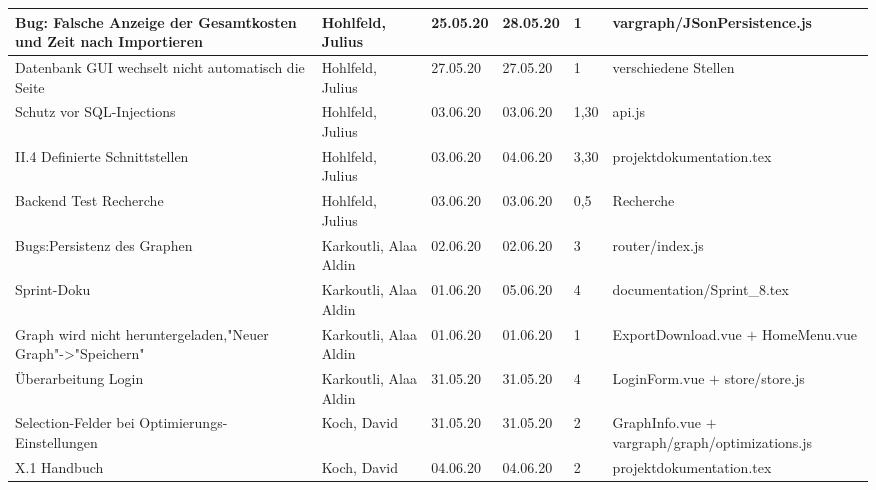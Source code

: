 \begin{longtable}{|p{4cm}|p{2cm}|p{1.2cm}|p{1.2cm}|p{0.7cm}|p{3.8cm}|}
  Bug: Falsche Anzeige der Gesamtkosten und Zeit nach Importieren       & Hohlfeld, Julius      & 25.05.20 & 28.05.20 & 1     & vargraph/JSonPersistence.js                                                    \\ \hline         
  Datenbank GUI wechselt nicht automatisch die Seite                    & Hohlfeld, Julius      & 27.05.20 & 27.05.20 & 1     & verschiedene Stellen                                          \\ \hline
  Schutz vor SQL-Injections                                             & Hohlfeld, Julius      & 03.06.20 & 03.06.20 & 1,30  & api.js                                                      \\ \hline
  II.4 Definierte Schnittstellen                                        & Hohlfeld, Julius      & 03.06.20 & 04.06.20 & 3,30  & projektdokumentation.tex                                                      \\ \hline
  Backend Test Recherche                                                & Hohlfeld, Julius      & 03.06.20 & 03.06.20 & 0,5   & Recherche                                                    \\ \hline

  Bugs:Persistenz des Graphen                                           & Karkoutli, Alaa Aldin & 02.06.20 & 02.06.20 & 3     & router/index.js                                              \\ \hline
  Sprint-Doku                                                           & Karkoutli, Alaa Aldin & 01.06.20 & 05.06.20 & 4     & documentation/Sprint\_8.tex                                            \\ \hline
  Graph wird nicht heruntergeladen,"Neuer Graph"->"Speichern"           & Karkoutli, Alaa Aldin & 01.06.20 & 01.06.20 & 1     & ExportDownload.vue $+$ HomeMenu.vue                                          \\ \hline
  Überarbeitung Login                                                   & Karkoutli, Alaa Aldin & 31.05.20 & 31.05.20 & 4     & LoginForm.vue $+$ store/store.js                                          \\ \hline
  
  
  Selection-Felder bei Optimierungs-Einstellungen                       & Koch, David           & 31.05.20 & 31.05.20 & 2     & GraphInfo.vue $+$ vargraph/graph/optimizations.js                                                   \\ \hline
  X.1 Handbuch                                                          & Koch, David           & 04.06.20 & 04.06.20 & 2     & projektdokumentation.tex                                         
\\ \hline
\end{longtable}


